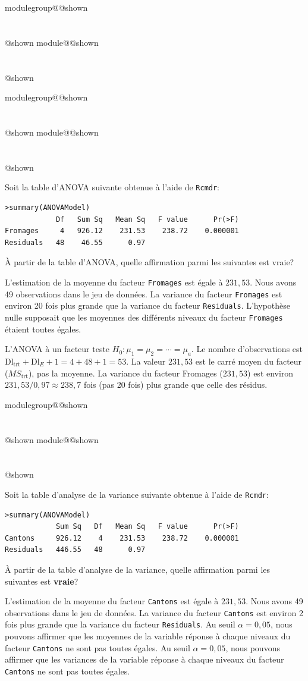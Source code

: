 \documentclass{Evaluation}
\makeatletter
\newcommand{\currentmodulekey}{}
\newcommand{\currentmoduletitle}{}
\newcommand{\currentgroupkey}{}
\newcommand{\currentgrouptitle}{}
\newcommand{\showmoduleifneeded}{%
  \ifx\currentgroupkey\empty\else
    \expandafter\ifx\csname modulegroup@\currentgroupkey @shown\endcsname\relax
      \section*{\currentgrouptitle}%
      \expandafter\gdef\csname modulegroup@\currentgroupkey @shown\endcsname{1}%
    \fi
  \fi
  \expandafter\ifx\csname module@\currentmodulekey @shown\endcsname\relax
    \section*{\currentmoduletitle}%
    \expandafter\gdef\csname module@\currentmodulekey @shown\endcsname{1}%
  \fi
}
\newenvironment{H23}{\showmoduleifneeded}{}
\newenvironment{A23}{\showmoduleifneeded}{}
\newenvironment{A25}{\showmoduleifneeded}{}
\makeatother
\begin{document}
\begin{questions}
\begin{H23}
\end{H23}

\begin{A23}
\question {} %
Soit la table d'ANOVA suivante obtenue à l'aide de \texttt{Rcmdr}:
\begin{verbatim}
>summary(ANOVAModel)
            Df   Sum Sq   Mean Sq   F value      Pr(>F)
Fromages     4   926.12    231.53    238.72    0.000001
Residuals   48    46.55      0.97
\end{verbatim}

À partir de la table d'ANOVA, quelle affirmation parmi les suivantes est vraie?

\begin{checkboxes}
\choice L'estimation de la moyenne du facteur \texttt{Fromages} est égale à $231,53$.
\choice Nous avons 49 observations dans le jeu de données.
\choice La variance du facteur \texttt{Fromages} est environ 20 fois plus grande que la variance du facteur \texttt{Residuals}.
\correctchoice L'hypothèse nulle supposait que les moyennes des différents niveaux du facteur \texttt{Fromages} étaient toutes égales.
\end{checkboxes}

\begin{solution}
L'ANOVA à un facteur teste $H_0\!: \mu_1=\mu_2=\cdots=\mu_a$. Le nombre d'observations est $\text{Dl}_{\text{trt}}+\text{Dl}_E+1 = 4+48+1 = 53$. La valeur $231{,}53$ est le carré moyen du facteur ($MS_{\text{trt}}$), pas la moyenne. La variance du facteur Fromages ($231{,}53$) est environ $231{,}53/0{,}97 \approx 238{,}7$ fois (pas 20 fois) plus grande que celle des résidus.
\end{solution}
\end{A23}

\begin{A25}
\question {} %
Soit la table d'analyse de la variance suivante obtenue à l'aide de \texttt{Rcmdr}:
\begin{verbatim}
>summary(ANOVAModel)
            Sum Sq   Df   Mean Sq   F value      Pr(>F)
Cantons     926.12    4    231.53    238.72    0.000001
Residuals   446.55   48      0.97
\end{verbatim}

À partir de la table d'analyse de la variance, quelle affirmation parmi les suivantes est \textbf{vraie}?



\begin{checkboxes}
\choice L'estimation de la moyenne du facteur \texttt{Cantons} est égale à $231,53$.
\choice Nous avons 49 observations dans le jeu de données.
\choice La variance du facteur \texttt{Cantons} est environ 2 fois plus grande que la variance du facteur \texttt{Residuals}.
\correctchoice Au seuil $\alpha=0,05$, nous pouvons affirmer que les moyennes de la variable réponse à chaque niveaux du facteur \texttt{Cantons} ne sont pas toutes égales.
\choice Au seuil $\alpha=0,05$, nous pouvons affirmer que les variances de la variable réponse à chaque niveaux du facteur \texttt{Cantons} ne sont pas toutes égales.
\end{checkboxes}


\end{A25}
\end{questions}
\end{document}
